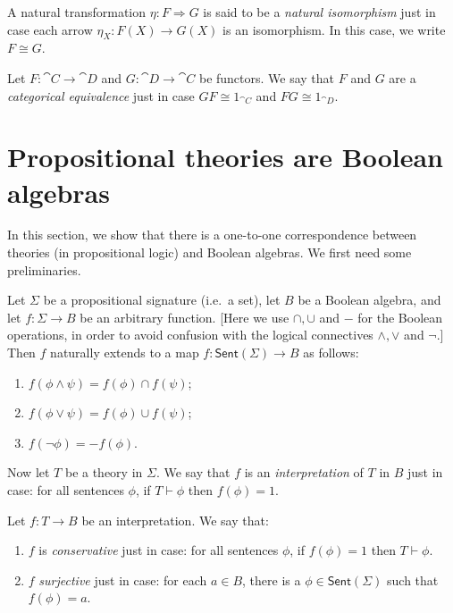 \begin{defn} A natural transformation $\eta :F\Rightarrow G$ is said
  to be a \emph{natural isomorphism} just in case each arrow $\eta
  _X:F(X)\to G(X)$ is an isomorphism.  In this case, we write $F\cong
  G$. \end{defn}

\begin{defn} Let $F:\cat{C}\to \cat{D}$ and $G:\cat{D}\to \cat{C}$ be
  functors.  We say that $F$ and $G$ are a \emph{categorical
    equivalence} just in case $GF\cong 1_{\cat{C}}$ and
  $FG\cong 1_{\cat{D}}$. \label{df:cateq} \end{defn}





\section{Propositional theories are Boolean algebras}

In this section, we show that there is a one-to-one correspondence
between theories (in propositional logic) and Boolean algebras.  We
first need some preliminaries.

\begin{defn} Let $\Sigma$ be a propositional signature (i.e.\ a set),
  let $B$ be a Boolean algebra, and let $f:\Sigma\to B$ be an
  arbitrary function.  [Here we use $\cap ,\cup$ and $-$ for the
  Boolean operations, in order to avoid confusion with the logical
  connectives $\wedge ,\vee$ and $\neg$.]  Then $f$ naturally extends
  to a map $f:\mathsf{Sent}(\Sigma )\to B$ as
  follows: \begin{enumerate}
  \item $f(\phi\wedge\psi )=f(\phi )\cap f(\psi )$;
  \item $f(\phi\vee \psi )=f(\phi )\cup f(\psi )$;
  \item $f(\neg \phi) = -f(\phi )$.
\end{enumerate}
Now let $T$ be a theory in $\Sigma$.  We say that $f$ is an
\emph{interpretation} of $T$ in $B$ just in case: for all sentences
$\phi$, if $T\vdash \phi$ then $f(\phi )=1$.  \end{defn}

\begin{defn} Let $f:T\to B$ be an interpretation.  We say that:
\begin{enumerate}
\item $f$ is \emph{conservative} just in case: for all sentences
  $\phi$, if $f(\phi )=1$ then $T\vdash\phi$.
\item $f$ \emph{surjective} just in case: for each $a\in B$, there is
  a $\phi\in\mathsf{Sent}(\Sigma )$ such that $f(\phi
  )=a$. \end{enumerate} \end{defn}


